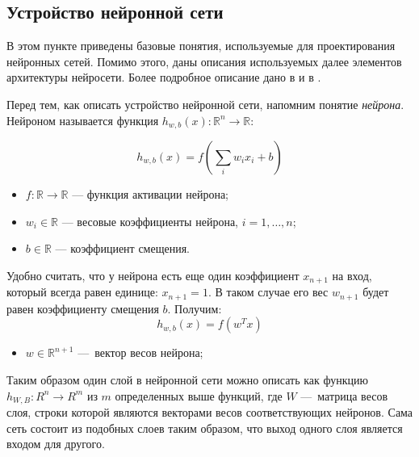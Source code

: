 \documentclass[14pt, a4paper]{extarticle}
\begin{document}
\subsection*{Устройство нейронной сети}

В этом пункте приведены базовые понятия, используемые для проектирования нейронных сетей. Помимо этого, даны описания используемых далее элементов архитектуры нейросети. Более подробное описание дано в \cite{deep_learning} и в \cite{haykin}.

Перед тем, как описать устройство нейронной сети, напомним понятие \textit{нейрона}. Нейроном называется функция $h_{w, b}(x): \mathbb{R}^{n} \rightarrow \mathbb{R}$:

\begin{equation*}
	h_{w, b}(x) = f(\sum_i w_ix_i + b)
\end{equation*}
\begin{itemize}
\item $f: \mathbb{R} \rightarrow \mathbb{R} $ — функция активации нейрона;
\item $w_i \in \mathbb{R} $ — весовые коэффициенты нейрона, $i = 1,\dots,n$;
\item $b \in \mathbb{R}$ — коэффициент смещения.
\end{itemize}

Удобно считать, что у нейрона есть еще один коэффициент $x_{n+1}$ на вход, который всегда равен единице: $x_{n+1} = 1$. В таком случае его вес $w_{n+1}$ будет равен коэффициенту смещения $b$. Получим:
\begin{equation*}
	h_{w, b}(x) = f(w^Tx)	
\end{equation*}
\begin{itemize}
	\item $w \in \mathbb{R}^{n+1}$ — вектор весов нейрона;
\end{itemize}


Таким образом один слой в нейронной сети можно описать как функцию $h_{W, B}: R^{n} \rightarrow R^m$ из $m$ определенных выше функций, где $W$ — матрица весов слоя, строки которой являются векторами весов соответствующих нейронов. Сама сеть состоит из подобных слоев таким образом, что выход одного слоя является входом для другого. 
\end{document}
